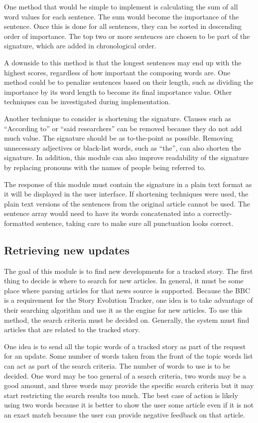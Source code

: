 \documentclass[11pt,titlepage]{report}
\begin{document}
One method that would be simple to implement is calculating the sum of all word values for each sentence. The sum would become the importance of the sentence. Once this is done for all sentences, they can be sorted in descending order of importance. The top two or more sentences are chosen to be part of the signature, which are added in chronological order. 

A downside to this method is that the longest sentences may end up with the highest scores, regardless of how important the composing words are. One method could be to penalize sentences based on their length, such as dividing the importance by its word length to become its final importance value. Other techniques can be investigated during implementation.

Another technique to consider is shortening the signature. Clauses such as ``According to'' or ``said researchers'' can be removed because they do not add much value. The signature should be as to-the-point as possible. Removing unnecessary adjectives or black-list words, such as ``the'', can also shorten the signature. In addition, this module can also improve readability of the signature by replacing pronouns with the names of people being referred to. 

The response of this module must contain the signature in a plain text format as it will be displayed in the user interface. If shortening techniques were used, the plain text versions of the sentences from the original article cannot be used. The sentence array would need to have its words concatenated into a correctly-formatted sentence, taking care to make sure all punctuation looks correct.

\subsection{Retrieving new updates}
The goal of this module is to find new developments for a tracked story. The first thing to decide is where to search for new articles. In general, it must be some place where parsing articles for that news source is supported. Because the BBC is a requirement for the Story Evolution Tracker, one idea is to take advantage of their searching algorithm and use it as the engine for new articles. To use this method, the search criteria must be decided on. Generally, the system must find articles that are related to the tracked story.

One idea is to send all the topic words of a tracked story as part of the request for an update. Some number of words taken from the front of the topic words list can act as part of the search criteria. The number of words to use is to be decided. One word may be too general of a search criteria, two words may be a good amount, and three words may provide the specific search criteria but it may start restricting the search results too much. The best case of action is likely using two words because it is better to show the user some article even if it is not an exact match because the user can provide negative feedback on that article.
\end{document}

